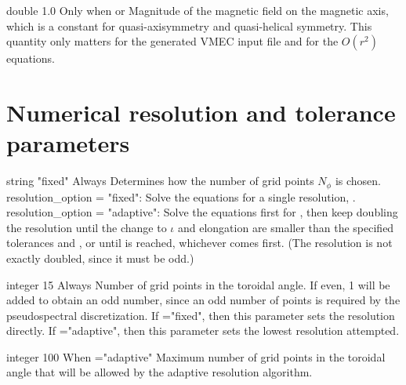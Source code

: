 \myhrule

{double}
{1.0}
{Only when  or }
{Magnitude of the magnetic field on the magnetic axis, which is a constant for quasi-axisymmetry and quasi-helical symmetry. This quantity only matters for the generated VMEC input file and for the $O(r^2)$ equations.}

\myhrule


\section{Numerical resolution and tolerance parameters}

{string}
{{\ttfamily "fixed"}}
{Always}
{Determines how the number of grid points $N_{\phi}$ is chosen.\\

{\ttfamily resolution\_option} = {\ttfamily "fixed"}: Solve the equations for a single resolution, .\\

{\ttfamily resolution\_option} = {\ttfamily "adaptive"}: Solve the equations first for , then keep doubling the resolution until the change to $\iota$ and elongation are smaller than the specified tolerances  and , or until  is reached, whichever comes first. (The resolution is not exactly doubled, since it must be odd.)\\

}

\myhrule

{integer}
{15}
{Always}
{Number of grid points in the toroidal angle. If even, 1 will be added to obtain an odd number, since an odd number of points is required by the pseudospectral discretization. If ={\ttfamily "fixed"}, then this parameter sets the resolution directly. If ={\ttfamily "adaptive"}, then this parameter sets the lowest resolution attempted.}

\myhrule

{integer}
{100}
{When ={\ttfamily "adaptive"}}
{Maximum number of grid points in the toroidal angle that will be allowed by the adaptive resolution algorithm.}

